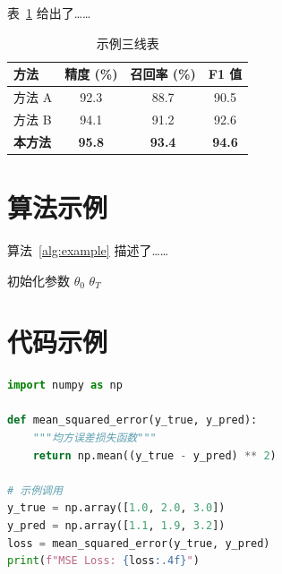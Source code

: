 表~\ref{tab:example} 给出了……

\begin{table}[htbp]
    \centering
    \caption{示例三线表}
    \label{tab:example}
    \begin{tabular}{lccc}
        \toprule
        \textbf{方法} & \textbf{精度 (\%)} & \textbf{召回率 (\%)} & \textbf{F1 值} \\
        \midrule
        方法 A & 92.3 & 88.7 & 90.5 \\
        方法 B & 94.1 & 91.2 & 92.6 \\
        \textbf{本方法} & \textbf{95.8} & \textbf{93.4} & \textbf{94.6} \\
        \bottomrule
    \end{tabular}
\end{table}

\section{算法示例}

算法~\ref{alg:example} 描述了……

\begin{algorithm}[htbp]
    \caption{示例算法}
    \label{alg:example}
    初始化参数 $\theta_0$\;
    \Return $\theta_T$\;
\end{algorithm}

\section{代码示例}

\begin{lstlisting}[language=Python, caption={Python 代码示例}]
import numpy as np

def mean_squared_error(y_true, y_pred):
    """均方误差损失函数"""
    return np.mean((y_true - y_pred) ** 2)

# 示例调用
y_true = np.array([1.0, 2.0, 3.0])
y_pred = np.array([1.1, 1.9, 3.2])
loss = mean_squared_error(y_true, y_pred)
print(f"MSE Loss: {loss:.4f}")
\end{lstlisting}
